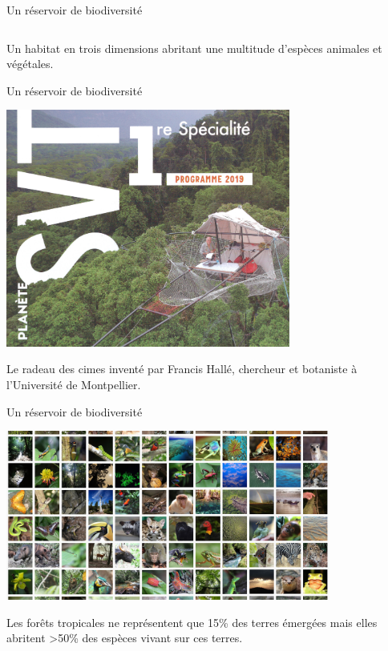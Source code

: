 \documentclass[10pt,table,dvipsnames,compress]{beamer}
\begin{document}
\begin{frame}[label={sec:org7f62daa}]{Un réservoir de biodiversité}
\begin{columns}
\begin{column}{0.5\columnwidth}
\begin{center}
\end{center}
\end{column}
\end{columns}
Un habitat en trois dimensions abritant une multitude d'espèces animales et végétales.
\end{frame}
\begin{frame}[label={sec:org9de8858}]{Un réservoir de biodiversité}
\begin{center}
\includegraphics[width=0.7\textwidth]{figs/planete-svt.png}
\end{center}

Le radeau des cimes inventé par Francis Hallé, chercheur et botaniste à l'Université de Montpellier.
\end{frame}
\begin{frame}[label={sec:orgdb1bc31}]{Un réservoir de biodiversité}
\begin{center}
\includegraphics[width=0.8\textwidth]{figs/biodiversity-in-tropical-forests-2.jpg}
\end{center}

Les forêts tropicales ne représentent que 15\% des terres émergées mais elles abritent >50\% des espèces vivant sur ces terres.
\end{frame}
\end{document}
